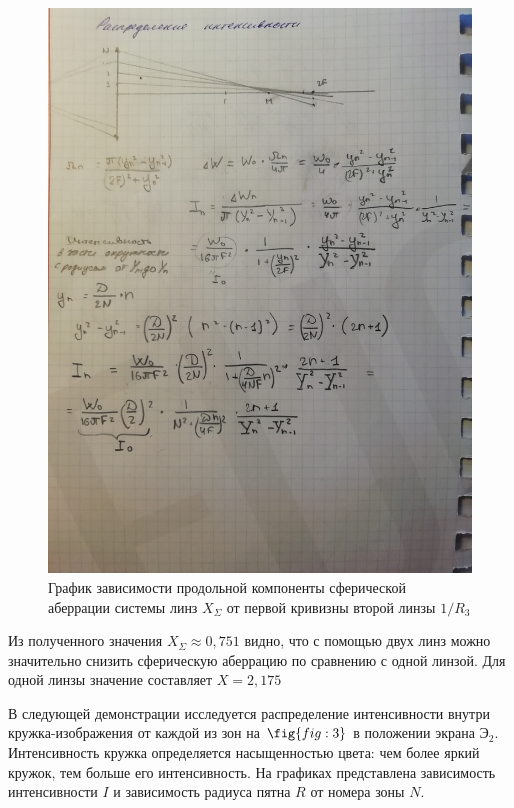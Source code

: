 \documentclass[a4paper, 12pt]{article}
\begin{document}
\begin{figure}[H]
    \includegraphics[width=0.8\linewidth]{5} 
    \caption{График зависимости продольной компоненты сферической
аберрации системы линз $X_\Sigma$ от первой кривизны второй линзы $1/R_3$}
\label{fig:5}
\end{figure}

Из полученного значения $X_\Sigma \approx 0,751$ видно, что с помощью
двух линз можно значительно снизить сферическую аберрацию по сравнению
с одной линзой. Для одной линзы значение составляет $X = 2,175$

В следующей демонстрации исследуется распределение интенсивности
внутри кружка-изображения от каждой из зон на $\fig{fig:3}$ в
положении экрана $\text{Э}_2$.
Интенсивность кружка определяется насыщенностью цвета: чем более яркий
кружок, тем больше его интенсивность. На графиках представлена
зависимость интенсивности $I$ и зависимость радиуса пятна $R$
от номера зоны $N$.
\end{document}

